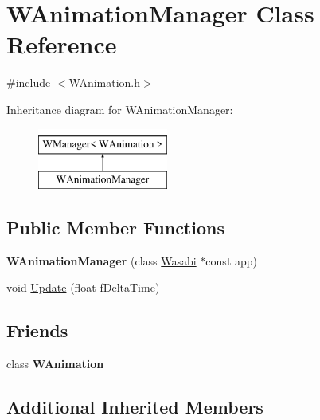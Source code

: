 \hypertarget{class_w_animation_manager}{}\section{W\+Animation\+Manager Class Reference}
\label{class_w_animation_manager}


{\ttfamily \#include $<$W\+Animation.\+h$>$}

Inheritance diagram for W\+Animation\+Manager\+:\begin{figure}[H]
\begin{center}
\leavevmode
\includegraphics[height=2.000000cm]{class_w_animation_manager}
\end{center}
\end{figure}
\subsection*{Public Member Functions}
\begin{DoxyCompactItemize}
\item 
{\bfseries W\+Animation\+Manager} (class \hyperlink{class_wasabi}{Wasabi} $\ast$const app)\hypertarget{class_w_animation_manager_a078d79eab136d9238efa6d1db929b7a3}{}\label{class_w_animation_manager_a078d79eab136d9238efa6d1db929b7a3}

\item 
void \hyperlink{class_w_animation_manager_a79fa19592cce15bf2cad83c7001551ee}{Update} (float f\+Delta\+Time)
\end{DoxyCompactItemize}
\subsection*{Friends}
\begin{DoxyCompactItemize}
\item 
class {\bfseries W\+Animation}\hypertarget{class_w_animation_manager_a8d42d4694d1ec3b38e25bb1c25f0db69}{}\label{class_w_animation_manager_a8d42d4694d1ec3b38e25bb1c25f0db69}

\end{DoxyCompactItemize}
\subsection*{Additional Inherited Members}


